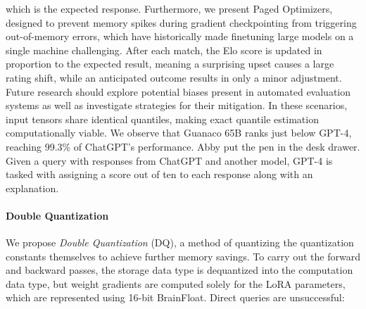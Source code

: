 which is the expected response. Furthermore, we present Paged Optimizers, designed to prevent memory spikes during gradient checkpointing from triggering out-of-memory errors, which have historically made finetuning large models on a single machine challenging. After each match, the Elo score is updated in proportion to the expected result, meaning a surprising upset causes a large rating shift, while an anticipated outcome results in only a minor adjustment. Future research should explore potential biases present in automated evaluation systems as well as investigate strategies for their mitigation. In these scenarios, input tensors share identical quantiles, making exact quantile estimation computationally viable. We observe that {Guanaco} 65B ranks just below GPT-4, reaching 99.3\% of ChatGPT's performance. Abby put the pen in the desk drawer. Given a query with responses from ChatGPT and another model, GPT-4 is tasked with assigning a score out of ten to each response along with an explanation. \paragraph{Double Quantization{}} 
We propose \emph{Double Quantization} (DQ), a method of quantizing the quantization constants themselves to achieve further memory savings. To carry out the forward and backward passes, the storage data type is dequantized into the computation data type, but weight gradients are computed solely for the LoRA parameters, which are represented using 16-bit BrainFloat. Direct queries are unsuccessful:


